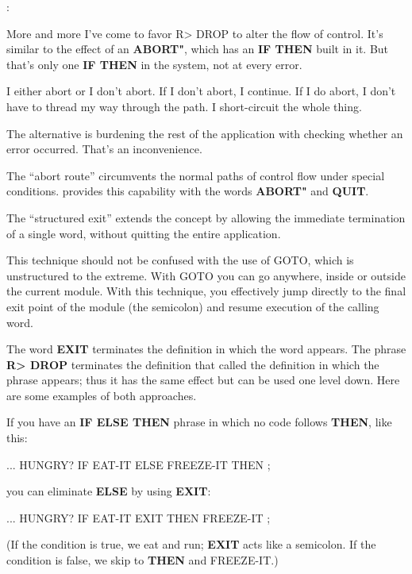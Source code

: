 \begin{interview}
:
\begin{tfquot}
More and more I've come to favor R> DROP to alter the flow of control.
It's similar to the effect of an \textbf{ABORT"}, which has an \textbf{IF THEN}
built in it. But that's only one \textbf{IF THEN} in the system, not at every
error.

I either abort or I don't abort. If I don't abort, I continue. If I do abort, I
don't have to thread my way through the path. I short-circuit the whole
thing.

The alternative is burdening the rest of the application with checking
whether an error occurred. That's an inconvenience.
\end{tfquot}
\end{interview}
The ``abort route'' circumvents the normal paths of control flow under
special conditions. \Forth{} provides this capability with the words
\textbf{ABORT"} and \textbf{QUIT}.

The ``structured exit'' extends the concept by allowing the immediate
termination of a single word, without quitting the entire application.

This technique should not be confused with the use of GOTO, which
is unstructured to the extreme. With GOTO you can go anywhere, inside
or outside the current module. With this technique, you effectively jump
directly to the final exit point of the module (the semicolon) and resume
execution of the calling word.

The word \textbf{EXIT} terminates the definition in which the word appears.
The phrase \textbf{R> DROP} terminates the definition that called the
definition in which the phrase appears; thus it has the same effect but can
be used one level down. Here are some examples of both approaches.

If you have an \textbf{IF ELSE THEN} phrase in which no code follows
\textbf{THEN}, like this:

\begin{Code}
... HUNGRY?  IF  EAT-IT  ELSE  FREEZE-IT  THEN ;
\end{Code}
you can eliminate \textbf{ELSE} by using \textbf{EXIT}:

\begin{Code}
... HUNGRY?  IF EAT-IT EXIT  THEN  FREEZE-IT ;
\end{Code}
(If the condition is true, we eat and run; \textbf{EXIT} acts like a semicolon.
If the condition is false, we skip to \textbf{THEN} and FREEZE-IT.)

